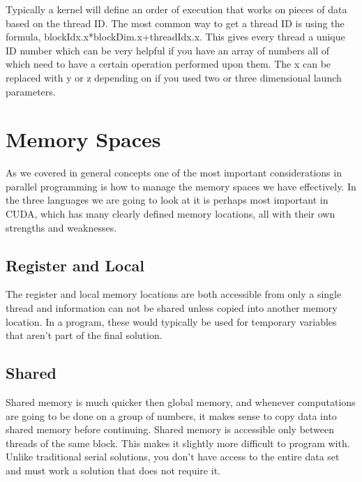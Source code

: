 \documentclass{article}
\newcommand{\comp}[1]{{\ttfamily #1}}
\begin{document}
    Typically a kernel will define an order of execution that works on pieces of data based on the thread ID. The most common way to get a thread ID is using the formula, \comp{blockIdx.x*blockDim.x+threadIdx.x}. This gives every thread a unique ID number which can be very helpful if you have an array of numbers all of which need to have a certain operation performed upon them. The \comp{x} can be replaced with \comp{y} or \comp{z} depending on if you used two or three dimensional launch parameters.

    \section{Memory Spaces}
    As we covered in general concepts one of the most important considerations in parallel programming is how to manage the memory spaces we have effectively. In the three languages we are going to look at it is perhaps most important in CUDA, which has many clearly defined memory locations, all with their own strengths and weaknesses.
      \subsection{Register and Local}
	  The register and local memory locations are both accessible from only a single thread and information can not be shared unless copied into another memory location. In a program, these would typically be used for temporary variables that aren't part of the final solution. 
      \subsection{Shared}
      Shared memory is much quicker then global memory, and whenever computations are going to be done on a group of numbers, it makes sense to copy data into shared memory before continuing. Shared memory is accessible only between threads of the same block. This makes it slightly more difficult to program with. Unlike traditional serial solutions, you don't have access to the entire data set and must work a solution that does not require it.
\end{document}
